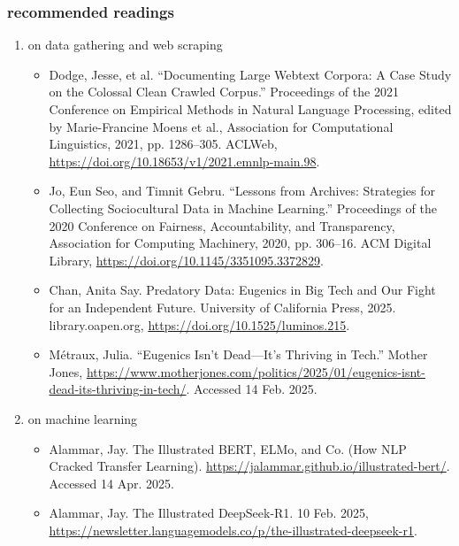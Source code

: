\documentclass[11pt]{article}
\begin{document}
\subsubsection{recommended readings}
\label{sec:org1dbeb1a}

\begin{enumerate}
\item on data gathering and web scraping
\label{sec:org9e6db19}
\begin{itemize}
\item Dodge, Jesse, et al. “Documenting Large Webtext Corpora: A Case
Study on the Colossal Clean Crawled Corpus.” Proceedings of the 2021
Conference on Empirical Methods in Natural Language Processing,
edited by Marie-Francine Moens et al., Association for Computational
Linguistics, 2021, pp. 1286–305. ACLWeb,
\url{https://doi.org/10.18653/v1/2021.emnlp-main.98}.
\item Jo, Eun Seo, and Timnit Gebru. “Lessons from Archives: Strategies
for Collecting Sociocultural Data in Machine Learning.” Proceedings
of the 2020 Conference on Fairness, Accountability, and
Transparency, Association for Computing Machinery, 2020, pp. 306–16.
ACM Digital Library, \url{https://doi.org/10.1145/3351095.3372829}.
\item Chan, Anita Say. Predatory Data: Eugenics in Big Tech and Our Fight
for an Independent Future. University of California Press, 2025.
library.oapen.org, \url{https://doi.org/10.1525/luminos.215}.
\item Métraux, Julia. “Eugenics Isn’t Dead—It’s Thriving in Tech.” Mother
Jones,
\url{https://www.motherjones.com/politics/2025/01/eugenics-isnt-dead-its-thriving-in-tech/}.
Accessed 14 Feb. 2025.
\end{itemize}

\item on machine learning
\label{sec:org1cabce4}
\begin{itemize}
\item Alammar, Jay. The Illustrated BERT, ELMo, and Co. (How NLP Cracked
Transfer Learning). \url{https://jalammar.github.io/illustrated-bert/}.
Accessed 14 Apr. 2025.
\item Alammar, Jay. The Illustrated DeepSeek-R1. 10 Feb. 2025,
\url{https://newsletter.languagemodels.co/p/the-illustrated-deepseek-r1}.
\end{itemize}


\end{enumerate}
\end{document}
